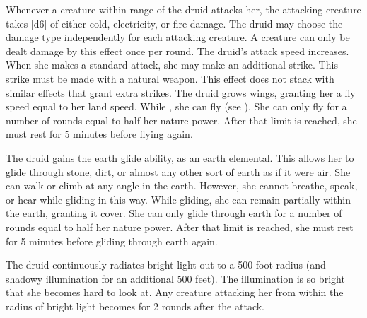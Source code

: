         Whenever a creature within \rngmed range of the druid attacks her, the attacking creature takes \spelldamage{}[d6] of either cold, electricity, or fire damage.
        The druid may choose the damage type independently for each attacking creature.
        A creature can only be dealt damage by this effect once per round.
        The druid's attack speed increases.
        When she makes a standard attack, she may make an additional strike.
        This strike must be made with a natural weapon.
        This effect does not stack with similar effects that grant extra strikes.
        The druid grows wings, granting her a fly speed equal to her land speed.
        While , she can fly (see ).
        She can only fly for a number of rounds equal to half her nature power.
        After that limit is reached, she must rest for 5 minutes before flying again.

        The druid gains the earth glide ability, as an earth elemental.
        This allows her to glide through stone, dirt, or almost any other sort of earth as if it were air.
        She can walk or climb at any angle in the earth.
        However, she cannot breathe, speak, or hear while gliding in this way.
        While gliding, she can remain partially within the earth, granting it cover.
        She can only glide through earth for a number of rounds equal to half her nature power.
        After that limit is reached, she must rest for 5 minutes before gliding through earth again.

        The druid continuously radiates bright light out to a 500 foot radius (and shadowy illumination for an additional 500 feet).
        The illumination is so bright that she becomes hard to look at.
        Any creature attacking her from within the radius of bright light becomes \partiallyblinded for 2 rounds after the attack.

